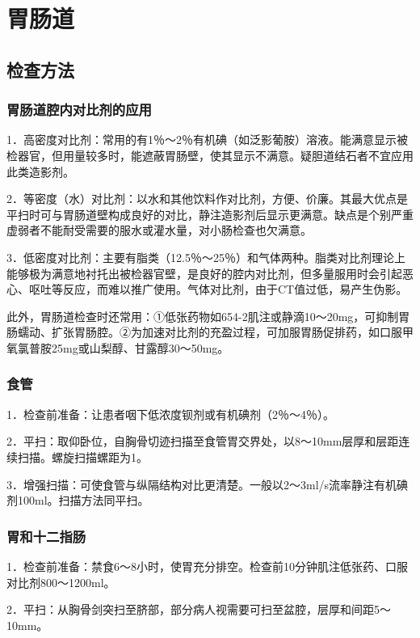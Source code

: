 \chapter{胃肠道}

\section{检查方法}

\subsection{胃肠道腔内对比剂的应用}

1．高密度对比剂：常用的有1％～2％有机碘（如泛影葡胺）溶液。能满意显示被检器官，但用量较多时，能遮蔽胃肠壁，使其显示不满意。疑胆道结石者不宜应用此类造影剂。

2．等密度（水）对比剂：以水和其他饮料作对比剂，方便、价廉。其最大优点是平扫时可与胃肠道壁构成良好的对比，静注造影剂后显示更满意。缺点是个别严重虚弱者不能耐受需要的服水或灌水量，对小肠检查也欠满意。

3．低密度对比剂：主要有脂类（12.5％～25％）和气体两种。脂类对比剂理论上能够极为满意地衬托出被检器官壁，是良好的腔内对比剂，但多量服用时会引起恶心、呕吐等反应，而难以推广使用。气体对比剂，由于CT值过低，易产生伪影。

此外，胃肠道检查时还常用：①低张药物如654-2肌注或静滴10～20mg，可抑制胃肠蠕动、扩张胃肠腔。②为加速对比剂的充盈过程，可加服胃肠促排药，如口服甲氧氯普胺25mg或山梨醇、甘露醇30～50mg。

\subsection{食管}

1．检查前准备：让患者咽下低浓度钡剂或有机碘剂（2％～4％）。

2．平扫：取仰卧位，自胸骨切迹扫描至食管胃交界处，以8～10mm层厚和层距连续扫描。螺旋扫描螺距为1。

3．增强扫描：可使食管与纵隔结构对比更清楚。一般以2～3ml/s流率静注有机碘剂100ml。扫描方法同平扫。

\subsection{胃和十二指肠}

1．检查前准备：禁食6～8小时，使胃充分排空。检查前10分钟肌注低张药、口服对比剂800～1200ml。

2．平扫：从胸骨剑突扫至脐部，部分病人视需要可扫至盆腔，层厚和间距5～10mm。

